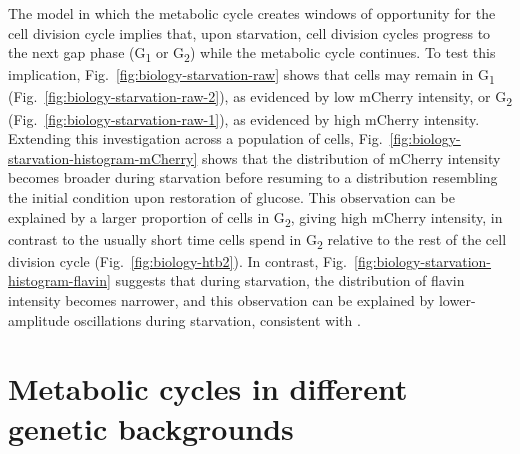 The model in which the metabolic cycle creates windows of opportunity for the cell division cycle implies that, upon starvation, cell division cycles progress to the next gap phase (G\textsubscript{1} or G\textsubscript{2}) while the metabolic cycle continues.
To test this implication, Fig.\ \ref{fig:biology-starvation-raw} shows that cells may remain in G\textsubscript{1} (Fig.\ \ref{fig:biology-starvation-raw-2}), as evidenced by low mCherry intensity, or G\textsubscript{2} (Fig.\ \ref{fig:biology-starvation-raw-1}), as evidenced by high mCherry intensity.
Extending this investigation across a population of cells, Fig.\ \ref{fig:biology-starvation-histogram-mCherry} shows that the distribution of mCherry intensity becomes broader during starvation before resuming to a distribution resembling the initial condition upon restoration of glucose.
This observation can be explained by a larger proportion of cells in G\textsubscript{2}, giving high mCherry intensity, in contrast to the usually short time cells spend in G\textsubscript{2} relative to the rest of the cell division cycle (Fig.\ \ref{fig:biology-htb2}).
In contrast, Fig.\ \ref{fig:biology-starvation-histogram-flavin} suggests that during starvation, the distribution of flavin intensity becomes narrower, and this observation can be explained by lower-amplitude oscillations during starvation, consistent with \parencite{papagiannakisAutonomousMetabolicOscillations2017}.


\section{Metabolic cycles in different genetic backgrounds}
\label{sec:biology-backgrounds}

